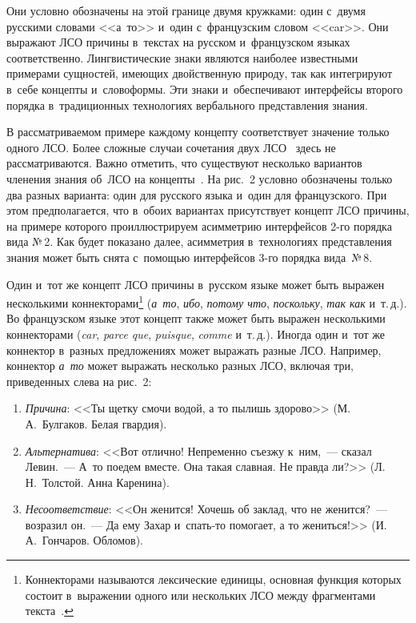 \begin{multicols}{2}
  Они условно обозначены на этой границе двумя кружками: один с~двумя 
русскими словами <<а~то>> и~один с~французским словом <<car>>. Они 
выражают ЛСО причины в~текстах на русском и~французском языках 
соответственно. Лингвистические знаки являются наиболее известными 
примерами сущностей, имеющих двойственную природу, так как интегрируют в~себе концепты и~словоформы. Эти знаки и~обеспечивают интерфейсы второго 
порядка в~традиционных технологиях вербального пред\-став\-ле\-ния знания.
  
  В рассматриваемом примере каждому концепту соответствует значение 
только одного ЛСО. Более сложные случаи сочетания двух ЛСО~\cite{19-zac} 
здесь не рассматриваются. Важно отметить, что существуют несколько 
вариантов членения знания об~ЛСО на  
концепты~\cite{20-zac, 21-zac, 22-zac, 23-zac}. На рис.~2 условно обозначены 
только два разных варианта: один для русского языка и~один для французского. 
При этом предполагается, что в~обоих вариантах присутствует концепт ЛСО 
причины, на примере которого проиллюстрируем асимметрию интерфейсов  
2-го порядка вида №\,2. Как будет показано далее, асимметрия в~технологиях 
представления знания может быть снята с~помощью интерфейсов 3-го порядка 
вида~№\,8.
  
  Один и~тот же концепт ЛСО причины в~русском языке может быть выражен 
несколькими коннекторами\footnote{Коннекторами называются лексические 
единицы, основная функция которых состоит в~выражении одного или 
нескольких ЛСО между фрагментами текста~\cite{15-zac, 16-zac}.} 
(\textit{а~то}, \textit{ибо}, \textit{потому что}, \textit{поскольку}, \textit{так 
как} и~т.\,д.). Во французском языке этот концепт также может быть выражен 
несколькими коннекторами (\textit{car}, \textit{parce que}, \textit{puisque}, 
\textit{comme} и~т.\,д.). Иногда один и~тот же коннектор в~разных 
предложениях может выражать разные ЛСО. Например, коннектор 
\textit{а~то} может выражать несколько разных ЛСО, включая три, 
приведенных слева на рис.~2:
  \begin{enumerate}[(1)]
\item \textit{Причина}: <<Ты щетку смочи водой, а то пылишь здорово>> 
(М.\,А.~Булгаков. Белая гвардия).
\item \textit{Альтернатива}: <<Вот отлично! Непременно съезжу к~ним,~--- 
сказал Левин.~--- А~то поедем вместе. Она такая славная. Не правда ли?>> 
(Л.\,Н.~Толстой. Анна Каренина).
\item \textit{Несоответствие}: <<Он женится! Хочешь об заклад, что не 
женится?~--- возразил он.~--- Да ему Захар и~спать-то помогает, а то 
жениться!>> (И.\,А.~Гончаров. Обломов).
  \end{enumerate}
  

\end{multicols}
